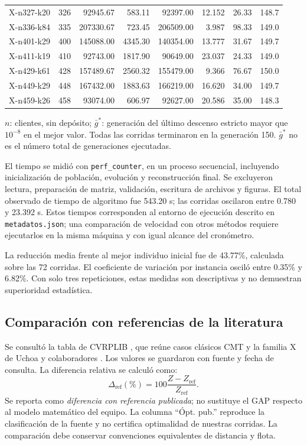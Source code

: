 \begin{center}
\begin{tabular}{lrrrrrrr}
X-n327-k20 & 326 & 92945.67 & 583.11 & 92397.00 & 12.152 & 26.33 & 148.7 \\
X-n336-k84 & 335 & 207330.67 & 723.45 & 206509.00 & 3.987 & 98.33 & 149.0 \\
X-n401-k29 & 400 & 145088.00 & 4345.30 & 140354.00 & 13.777 & 31.67 & 149.7 \\
X-n411-k19 & 410 & 92743.00 & 1817.90 & 90649.00 & 23.037 & 24.33 & 149.0 \\
X-n429-k61 & 428 & 157489.67 & 2560.32 & 155479.00 & 9.366 & 76.67 & 150.0 \\
X-n449-k29 & 448 & 167432.00 & 1883.63 & 166219.00 & 16.620 & 34.00 & 149.7 \\
X-n459-k26 & 458 & 93074.00 & 606.97 & 92627.00 & 20.586 & 35.00 & 148.3 \\
\bottomrule\end{tabular}
\end{center}
\noindent $n$: clientes, sin depósito; $\bar g^*$: generación del último descenso
estricto mayor que $10^{-8}$ en el mejor valor. Todas las corridas terminaron
en la generación 150. $\bar g^*$ no es el número total de generaciones ejecutadas.

El tiempo se midió con \texttt{perf\_counter}, en un proceso secuencial, incluyendo
inicialización de población, evolución y reconstrucción final. Se excluyeron
lectura, preparación de matriz, validación, escritura de archivos y figuras.
El total observado de tiempo de algoritmo fue 543.20 s; las corridas
oscilaron entre 0.780 y 23.392 s. Estos tiempos corresponden al entorno de
ejecución descrito en \texttt{metadatos.json}; una comparación de velocidad con
otros métodos requiere ejecutarlos en la misma máquina y con igual alcance
del cronómetro.

La reducción media frente al mejor individuo inicial fue de 43.77\%,
calculada sobre las 72 corridas. El coeficiente de variación por instancia
osciló entre 0.35\% y 6.82\%. Con solo tres repeticiones, estas
medidas son descriptivas y no demuestran superioridad estadística.

\clearpage
\subsection{Comparación con referencias de la literatura}
Se consultó la tabla de CVRPLIB \cite{cvrplib}, que reúne casos clásicos CMT y
la familia X de Uchoa y colaboradores \cite{uchoa2017}. Los valores se guardaron
con fuente y fecha de consulta. La diferencia relativa se calculó como:
\[
 \Delta_{\mathrm{ref}}(\%)=100\frac{Z-Z_{\mathrm{ref}}}{Z_{\mathrm{ref}}}.
\]
Se reporta como \emph{diferencia con referencia publicada}; no sustituye el
GAP respecto al modelo matemático del equipo. La columna ``Ópt. pub.'' reproduce
la clasificación de la fuente y no certifica optimalidad de nuestras corridas.
La comparación debe conservar convenciones equivalentes de distancia y flota.

